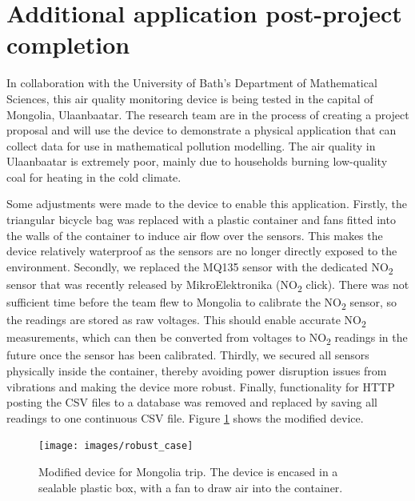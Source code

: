 \documentclass[11pt,twosided,a4paper]{report}
\begin{document}
\section{Additional application post-project completion}

In collaboration with the University of Bath's Department of Mathematical Sciences, this air quality monitoring device is being tested in the capital of Mongolia, Ulaanbaatar. The research team are in the process of creating a project proposal and will use the device to demonstrate a physical application that can collect data for use in mathematical pollution modelling. The air quality in Ulaanbaatar is extremely poor, mainly due to households burning low-quality coal for heating in the cold climate.

Some adjustments were made to the device to enable this application. Firstly, the triangular bicycle bag was replaced with a plastic container and fans fitted into the walls of the container to induce air flow over the sensors. This makes the device relatively waterproof as the sensors are no longer directly exposed to the environment. Secondly, we replaced the MQ135 sensor with the dedicated NO\textsubscript{2} sensor that was recently released by MikroElektronika (NO\textsubscript{2} click). There was not sufficient time before the team flew to Mongolia to calibrate the NO\textsubscript{2} sensor, so the readings are stored as raw voltages. This should enable accurate NO\textsubscript{2} measurements, which can then be converted from voltages to NO\textsubscript{2} readings in the future once the sensor has been calibrated. Thirdly, we secured all sensors physically inside the container, thereby avoiding power disruption issues from vibrations and making the device more robust. Finally, functionality for HTTP posting the CSV files to a database was removed and replaced by saving all readings to one continuous CSV file. Figure \ref{fig:modified_device} shows the modified device.

\begin{figure}[!tb]
\centering
\texttt{[image: images/robust\_case]}
\caption[Modified device for Mongolia trip.]{Modified device for Mongolia trip. The device is encased in a sealable plastic box, with a fan to draw air into the container.}
\label{fig:modified_device}
\end{figure}


\end{document}
